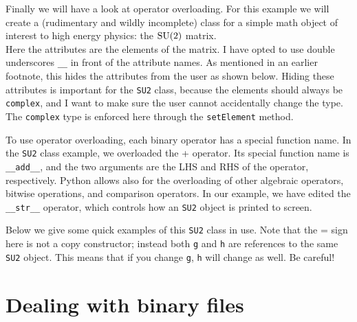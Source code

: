 



Finally we will have a look at operator overloading. For this example we
will create a (rudimentary and wildly incomplete) class for a simple math 
object of interest to high energy physics: the $\operatorname{SU}(2)$ matrix.\\



Here the attributes are the elements of the matrix. 
I have opted to use double underscores \texttt{\_\_} in front of
the attribute names. As mentioned in an earlier footnote, this hides the
attributes from the user as shown below.
Hiding these attributes is important for the \texttt{SU2} class, because the
elements should always be \texttt{complex}, and I want to make sure the
user cannot accidentally change the type. The \texttt{complex} type is
enforced here through the \texttt{setElement} method.




To use operator overloading, each binary operator has a special function name.
In the \texttt{SU2} class example, we overloaded the + operator. Its special
function name is \texttt{\_\_add\_\_}, and the two arguments are the LHS and
RHS of the operator, respectively. Python allows also for the overloading
of other algebraic operators, bitwise operations, and comparison operators.
In our example, we have edited the \texttt{\_\_str\_\_} operator, which
controls how an \texttt{SU2} object is printed to screen.

Below we give some quick examples of this \texttt{SU2} class in use. Note that
the = sign here is not a copy constructor; instead both \texttt{g} and
\texttt{h} are references to the same \texttt{SU2} object. This means that
if you change \texttt{g}, \texttt{h} will change as well. Be careful!\\ 





\section{Dealing with binary files}

